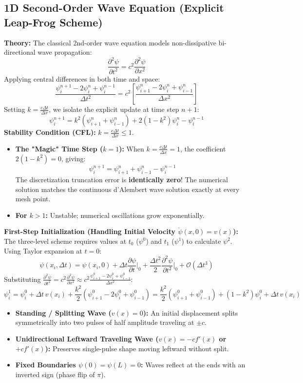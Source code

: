 \documentclass{article}
\begin{document}
\subsection{1D Second-Order Wave Equation (Explicit Leap-Frog Scheme)}
\textbf{Theory:} The classical 2nd-order wave equation models non-dissipative bi-directional wave propagation:
$$\frac{\partial^2 \psi}{\partial t^2} = c^2 \frac{\partial^2 \psi}{\partial x^2}$$
Applying central differences in both time and space:
$$\frac{\psi_i^{n+1} - 2\psi_i^n + \psi_i^{n-1}}{\Delta t^2} = c^2 \left[ \frac{\psi_{i+1}^n - 2\psi_i^n + \psi_{i-1}^n}{\Delta x^2} \right]$$
Setting $k = \frac{c \Delta t}{\Delta x}$, we isolate the explicit update at time step $n+1$:
$$\psi_i^{n+1} = k^2(\psi_{i+1}^n + \psi_{i-1}^n) + 2(1 - k^2)\psi_i^n - \psi_i^{n-1}$$
\textbf{Stability Condition (CFL):} $k = \frac{c \Delta t}{\Delta x} \le 1$.
\begin{itemize}
    \item \textbf{The "Magic" Time Step ($k = 1$):} When $k = \frac{c\Delta t}{\Delta x} = 1$, the coefficient $2(1 - k^2) = 0$, giving:
    $$\psi_i^{n+1} = \psi_{i+1}^n + \psi_{i-1}^n - \psi_i^{n-1}$$
    The discretization truncation error is \textbf{identically zero}! The numerical solution matches the continuous d'Alembert wave solution exactly at every mesh point.
    \item \textbf{For $k > 1$:} Unstable; numerical oscillations grow exponentially.
\end{itemize}

\textbf{First-Step Initialization (Handling Initial Velocity $\dot{\psi}(x, 0) = v(x)$):}
The three-level scheme requires values at $t_0$ ($\psi^0$) and $t_1$ ($\psi^1$) to calculate $\psi^2$. Using Taylor expansion at $t = 0$:
$$\psi(x_i, \Delta t) = \psi(x_i, 0) + \Delta t \frac{\partial \psi}{\partial t}\bigg|_0 + \frac{\Delta t^2}{2} \frac{\partial^2 \psi}{\partial t^2}\bigg|_0 + \mathcal{O}(\Delta t^3)$$
Substituting $\frac{\partial^2 \psi}{\partial t^2} = c^2 \frac{\partial^2 \psi}{\partial x^2} \approx c^2 \frac{\psi_{i+1}^0 - 2\psi_i^0 + \psi_{i-1}^0}{\Delta x^2}$:
$$\psi_i^1 = \psi_i^0 + \Delta t \, v(x_i) + \frac{k^2}{2} (\psi_{i+1}^0 - 2\psi_i^0 + \psi_{i-1}^0) = \frac{k^2}{2}(\psi_{i+1}^0 + \psi_{i-1}^0) + (1 - k^2)\psi_i^0 + \Delta t \, v(x_i)$$
\begin{itemize}
    \item \textbf{Standing / Splitting Wave ($v(x) = 0$):} An initial displacement splits symmetrically into two pulses of half amplitude traveling at $\pm c$.
    \item \textbf{Unidirectional Leftward Traveling Wave ($v(x) = -c f'(x)$ or $+c f'(x)$):} Preserves single-pulse shape moving leftward without split.
    \item \textbf{Fixed Boundaries $\psi(0) = \psi(L) = 0$:} Waves reflect at the ends with an inverted sign (phase flip of $\pi$).
\end{itemize}
\end{document}
